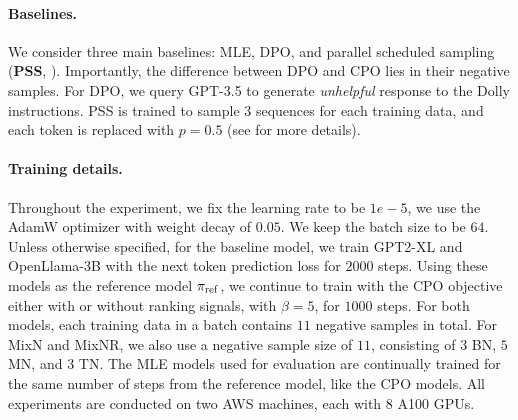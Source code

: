 \paragraph{Baselines.} We consider three main baselines: MLE, DPO, and parallel scheduled sampling (\textbf{PSS}, \citep{duckworth2019parallel}). Importantly, the difference between DPO and CPO lies in their negative samples. For DPO, we query GPT-3.5 to generate \textit{unhelpful} response to the Dolly instructions. PSS is trained to sample 3 sequences for each training data, and each token is replaced with $p=0.5$ (see \citet{duckworth2019parallel} for more details).
\begin{table}[tb]

 \caption{The win rate of GPT2-XL against the ground truth, samples generated by greedy decoding, evaluated by GPT-3.5.}
 \vspace{-0.5em}
\vspace{-0.5em}
\label{table:gpteval}
\end{table}
\vspace{-5pt}
\paragraph{Training details.} Throughout the experiment, we fix the learning rate to be $1e-5$, we use the AdamW optimizer with weight decay of $0.05$. We keep the batch size to be $64$. Unless otherwise specified, for the baseline model, we train GPT2-XL and OpenLlama-3B with the next token prediction loss for $2000$ steps. Using these models as the reference model $\pi_{\operatorname{ref}}$, we continue to train with the CPO objective either with or without ranking signals, with $\beta=5$, for $1000$ steps. For both models, each training data in a batch contains $11$ negative samples in total. For MixN and MixNR, we also use a negative sample size of $11$, consisting of $3$ BN, $5$ MN, and $3$ TN. The MLE models used for evaluation are continually trained for the same number of steps from the reference model, like the CPO models. All experiments are conducted on two AWS machines, each with $8$ A100 GPUs.


